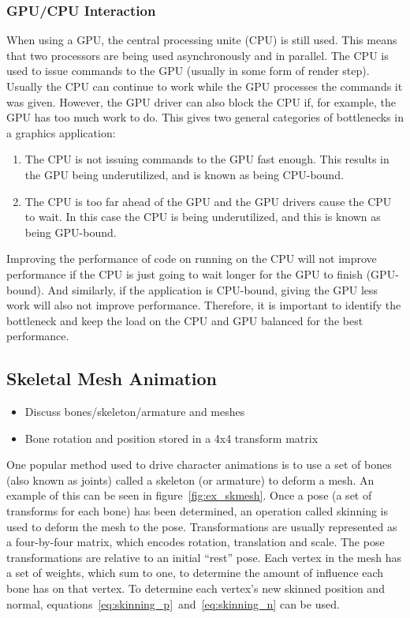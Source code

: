\subsubsection{GPU/CPU Interaction}
When using a GPU, the central processing unite (CPU) is still used.
This means that two processors are being used asynchronously and in parallel.
The CPU is used to issue commands to the GPU (usually in some form of render step).
Usually the CPU can continue to work while the GPU processes the commands it was given.
However, the GPU driver can also block the CPU if, for example, the GPU has too much work to do.
This gives two general categories of bottlenecks in a graphics application:
\begin{enumerate}
 \item The CPU is not issuing commands to the GPU fast enough. This results in the GPU being underutilized, and is known as being CPU-bound.
 \item The CPU is too far ahead of the GPU and the GPU drivers cause the CPU to wait. In this case the CPU is being underutilized, and this is known as being GPU-bound.
\end{enumerate}
Improving the performance of code on running on the CPU will not improve performance if the CPU is just going to wait longer for the GPU to finish (GPU-bound).
And similarly, if the application is CPU-bound, giving the GPU less work will also not improve performance.
Therefore, it is important to identify the bottleneck and keep the load on the CPU and GPU balanced for the best performance.

\subsection{Skeletal Mesh Animation}
\ifsummaries
\begin{itemize}
 \item Discuss bones/skeleton/armature and meshes
 \item Bone rotation and position stored in a 4x4 transform matrix
\end{itemize}
\fi

One popular method used to drive character animations is to use a set of bones (also known as joints) called a skeleton (or armature) to deform a mesh.
An example of this can be seen in figure~\ref{fig:ex_skmesh}.
Once a pose (a set of transforms for each bone) has been determined, an operation called skinning is used to deform the mesh to the pose.
Transformations are usually represented as a four-by-four matrix, which encodes rotation, translation and scale.
The pose transformations are relative to an initial ``rest'' pose.
Each vertex in the mesh has a set of weights, which sum to one, to determine the amount of influence each bone has on that vertex.
To determine each vertex's new skinned position and normal, equations~\ref{eq:skinning_p}~and~\ref{eq:skinning_n} can be used.


